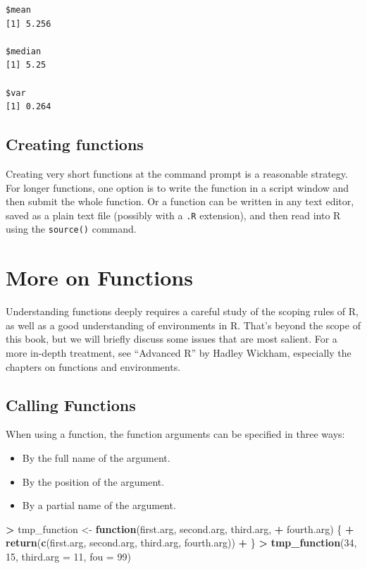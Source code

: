 \documentclass[]{krantz}
\makeatletter
\newenvironment{Shaded}{\begin{snugshade}}{\end{snugshade}}
\newcommand{\KeywordTok}[1]{\textcolor[rgb]{0.27,0.27,0.27}{\textbf{#1}}}
\newcommand{\DataTypeTok}[1]{\textcolor[rgb]{0.27,0.27,0.27}{#1}}
\newcommand{\DecValTok}[1]{\textcolor[rgb]{0.06,0.06,0.06}{#1}}
\newcommand{\StringTok}[1]{\textcolor[rgb]{0.5,0.5,0.5}{#1}}
\newcommand{\ControlFlowTok}[1]{\textcolor[rgb]{0.27,0.27,0.27}{\textbf{#1}}}
\newcommand{\OperatorTok}[1]{\textcolor[rgb]{0.43,0.43,0.43}{\textbf{#1}}}
\newcommand{\NormalTok}[1]{#1}
\providecommand{\tightlist}{%
  \setlength{\itemsep}{0pt}\setlength{\parskip}{0pt}}
\newenvironment{kframe}{%
\medskip{}
\setlength{\fboxsep}{.8em}
 \def\at@end@of@kframe{}%
 \ifinner\ifhmode%
  \def\at@end@of@kframe{\end{minipage}}%
  \begin{minipage}{\columnwidth}%
 \fi\fi%
 \def\FrameCommand##1{\hskip\@totalleftmargin \hskip-\fboxsep
 \colorbox{shadecolor}{##1}\hskip-\fboxsep
     \hskip-\linewidth \hskip-\@totalleftmargin \hskip\columnwidth}%
 \MakeFramed {\advance\hsize-\width
   \@totalleftmargin\z@ \linewidth\hsize
   \@setminipage}}%
 {\par\unskip\endMakeFramed%
 \at@end@of@kframe}
\renewenvironment{Shaded}{\begin{kframe}}{\end{kframe}}
\theoremstyle{definition}
\theoremstyle{definition}
\theoremstyle{definition}
\theoremstyle{remark}
\makeatother
\begin{document}
\begin{verbatim}
$mean
[1] 5.256

$median
[1] 5.25

$var
[1] 0.264
\end{verbatim}

\subsection{Creating functions}\label{creating-functions}

Creating very short functions at the command prompt is a reasonable
strategy. For longer functions, one option is to write the function in a
script window and then submit the whole function. Or a function can be
written in any text editor, saved as a plain text file (possibly with a
\texttt{.R} extension), and then read into R using the \texttt{source()}
command.

\section{More on Functions}\label{more-on-functions}

Understanding functions deeply requires a careful study of the scoping
rules of R, as well as a good understanding of environments in R. That's
beyond the scope of this book, but we will briefly discuss some issues
that are most salient. For a more in-depth treatment, see ``Advanced R''
by Hadley Wickham, especially the chapters on functions and
environments.

\subsection{Calling Functions}\label{calling-functions}

When using a function, the function arguments can be specified in three
ways:

\begin{itemize}
\tightlist
\item
  By the full name of the argument.
\item
  By the position of the argument.
\item
  By a partial name of the argument.
\end{itemize}

\begin{Shaded}
\begin{Highlighting}[]
\OperatorTok{>}\StringTok{ }\NormalTok{tmp_function <-}\StringTok{ }\ControlFlowTok{function}\NormalTok{(first.arg, second.arg, third.arg, }
\OperatorTok{+}\StringTok{   }\NormalTok{fourth.arg) \{}
\OperatorTok{+}\StringTok{   }\KeywordTok{return}\NormalTok{(}\KeywordTok{c}\NormalTok{(first.arg, second.arg, third.arg, fourth.arg))}
\OperatorTok{+}\StringTok{ }\NormalTok{\}}
\OperatorTok{>}\StringTok{ }\KeywordTok{tmp_function}\NormalTok{(}\DecValTok{34}\NormalTok{, }\DecValTok{15}\NormalTok{, }\DataTypeTok{third.arg =} \DecValTok{11}\NormalTok{, }\DataTypeTok{fou =} \DecValTok{99}\NormalTok{)}
\end{Highlighting}
\end{Shaded}
\end{document}
